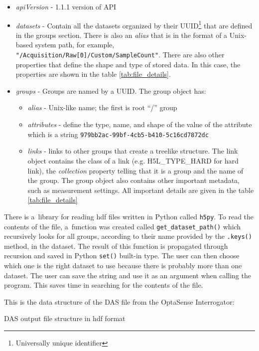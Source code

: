 \begin{itemize}
    \item \textit{apiVersion} - 1.1.1 version of API
    \item \textit{datasets} - Contain all the datasets organized by their UUID\footnote{Universally unique identifier} that are defined in the groups section. There is also an \textit{alias} that is in the format of a Unix-based system path, for example, \verb|"/Acquisition/Raw[0]/Custom/SampleCount"|. There are also other properties that define the shape and type of stored data. In this case, the properties are shown in the table \ref{tab:file_details}.
    \item \textit{groups} - Groups are named by a UUID. The group object has:
        \begin{itemize}
            \item \textit{alias} - Unix-like name; the first is root ``/'' group
            \item \textit{attributes} - define the type, name, and shape of the value of the attribute which is a string \verb|979bb2ac-99bf-4cb5-b410-5c16cd7872dc|
            \item \textit{links} - links to other groups that create a treelike structure. The link object contains the class of a link (e.g. H5L\_TYPE\_HARD for hard link), the \textit{collection} property telling that it is a group and the name of the group. The group object also contains other important metadata, such as measurement settings. All important details are given in the table \ref{tab:file_details}
        \end{itemize}
\end{itemize}

There is a~library for reading \ac{hdf} files written in Python called \verb|h5py|. To read the contents of the file, a~function was created called \verb|get_dataset_path()| which recursively looks for all groups, according to their name provided by the \verb|.keys()| method, in the dataset. The result of this function is propagated through recursion and saved in Python \verb|set()| built-in type. The user can then choose which one is the right dataset to use because there is probably more than one dataset. The user can save the string and use it as an argument when calling the program. This saves time in searching for the contents of the file. 

This is the data structure of the DAS file from the OptaSense Interrogator:

\bigskip
DAS output file structure in \ac{hdf} format
{\small
%
\label{dir:filestructure}
}
\bigskip

